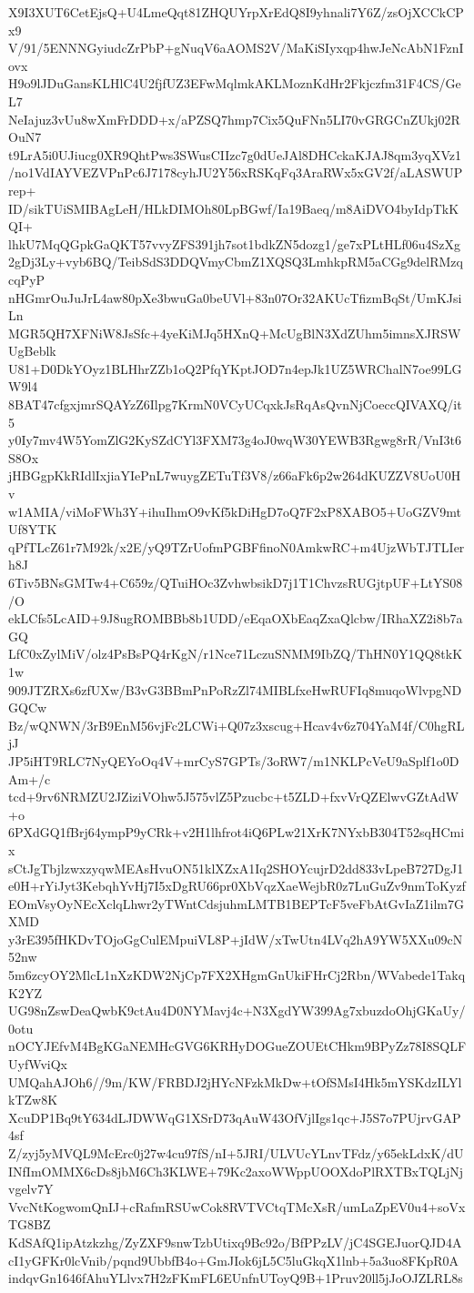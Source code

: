 X9I3XUT6CetEjsQ+U4LmeQqt81ZHQUYrpXrEdQ8I9yhnali7Y6Z/zsOjXCCkCPx9
V/91/5ENNNGyiudcZrPbP+gNuqV6aAOMS2V/MaKiSIyxqp4hwJeNcAbN1FznIovx
H9o9lJDuGansKLHlC4U2fjfUZ3EFwMqlmkAKLMoznKdHr2Fkjczfm31F4CS/GeL7
NeIajuz3vUu8wXmFrDDD+x/aPZSQ7hmp7Cix5QuFNn5LI70vGRGCnZUkj02ROuN7
t9LrA5i0UJiucg0XR9QhtPws3SWusCIIzc7g0dUeJAl8DHCckaKJAJ8qm3yqXVz1
/no1VdIAYVEZVPnPc6J7178cyhJU2Y56xRSKqFq3AraRWx5xGV2f/aLASWUPrep+
ID/sikTUiSMIBAgLeH/HLkDIMOh80LpBGwf/Ia19Baeq/m8AiDVO4byIdpTkKQI+
lhkU7MqQGpkGaQKT57vvyZFS391jh7sot1bdkZN5dozg1/ge7xPLtHLf06u4SzXg
2gDj3Ly+vyb6BQ/TeibSdS3DDQVmyCbmZ1XQSQ3LmhkpRM5aCGg9delRMzqcqPyP
nHGmrOuJuJrL4aw80pXe3bwuGa0beUVl+83n07Or32AKUcTfizmBqSt/UmKJsiLn
MGR5QH7XFNiW8JsSfc+4yeKiMJq5HXnQ+McUgBlN3XdZUhm5imnsXJRSWUgBeblk
U81+D0DkYOyz1BLHhrZZb1oQ2PfqYKptJOD7n4epJk1UZ5WRChalN7oe99LGW9l4
8BAT47cfgxjmrSQAYzZ6Ilpg7KrmN0VCyUCqxkJsRqAsQvnNjCoeccQIVAXQ/it5
y0Iy7mv4W5YomZlG2KySZdCYl3FXM73g4oJ0wqW30YEWB3Rgwg8rR/VnI3t6S8Ox
jHBGgpKkRIdlIxjiaYIePnL7wuygZETuTf3V8/z66aFk6p2w264dKUZZV8UoU0Hv
w1AMIA/viMoFWh3Y+ihuIhmO9vKf5kDiHgD7oQ7F2xP8XABO5+UoGZV9mtUf8YTK
qPfTLcZ61r7M92k/x2E/yQ9TZrUofmPGBFfinoN0AmkwRC+m4UjzWbTJTLIerh8J
6Tiv5BNsGMTw4+C659z/QTuiHOc3ZvhwbsikD7j1T1ChvzsRUGjtpUF+LtYS08/O
ekLCfs5LcAID+9J8ugROMBBb8b1UDD/eEqaOXbEaqZxaQlcbw/IRhaXZ2i8b7aGQ
LfC0xZylMiV/olz4PsBsPQ4rKgN/r1Nce71LczuSNMM9IbZQ/ThHN0Y1QQ8tkK1w
909JTZRXs6zfUXw/B3vG3BBmPnPoRzZl74MIBLfxeHwRUFIq8muqoWlvpgNDGQCw
Bz/wQNWN/3rB9EnM56vjFc2LCWi+Q07z3xscug+Hcav4v6z704YaM4f/C0hgRLjJ
JP5iHT9RLC7NyQEYoOq4V+mrCyS7GPTs/3oRW7/m1NKLPcVeU9aSplf1o0DAm+/c
tcd+9rv6NRMZU2JZiziVOhw5J575vlZ5Pzucbc+t5ZLD+fxvVrQZElwvGZtAdW+o
6PXdGQ1fBrj64ympP9yCRk+v2H1lhfrot4iQ6PLw21XrK7NYxbB304T52sqHCmix
sCtJgTbjlzwxzyqwMEAsHvuON51klXZxA1Iq2SHOYcujrD2dd833vLpeB727DgJ1
e0H+rYiJyt3KebqhYvHj7I5xDgRU66pr0XbVqzXaeWejbR0z7LuGuZv9nmToKyzf
EOmVsyOyNEcXclqLhwr2yTWntCdsjuhmLMTB1BEPTcF5veFbAtGvIaZ1ilm7GXMD
y3rE395fHKDvTOjoGgCulEMpuiVL8P+jIdW/xTwUtn4LVq2hA9YW5XXu09cN52nw
5m6zcyOY2MlcL1nXzKDW2NjCp7FX2XHgmGnUkiFHrCj2Rbn/WVabede1TakqK2YZ
UG98nZswDeaQwbK9ctAu4D0NYMavj4c+N3XgdYW399Ag7xbuzdoOhjGKaUy/0otu
nOCYJEfvM4BgKGaNEMHcGVG6KRHyDOGueZOUEtCHkm9BPyZz78I8SQLFUyfWviQx
UMQahAJOh6//9m/KW/FRBDJ2jHYcNFzkMkDw+tOfSMsI4Hk5mYSKdzILYlkTZw8K
XcuDP1Bq9tY634dLJDWWqG1XSrD73qAuW43OfVjlIgs1qc+J5S7o7PUjrvGAP4sf
Z/zyj5yMVQL9McErc0j27w4cu97fS/nI+5JRI/ULVUcYLnvTFdz/y65ekLdxK/dU
INfImOMMX6cDs8jbM6Ch3KLWE+79Kc2axoWWppUOOXdoPlRXTBxTQLjNjvgelv7Y
VvcNtKogwomQnIJ+cRafmRSUwCok8RVTVCtqTMcXsR/umLaZpEV0u4+soVxTG8BZ
KdSAfQ1ipAtzkzhg/ZyZXF9snwTzbUtixq9Bc92o/BfPPzLV/jC4SGEJuorQJD4A
cI1yGFKr0lcVnib/pqnd9UbbfB4o+GmJIok6jL5C5luGkqX1lnb+5a3uo8FKpR0A
indqvGn1646fAhuYLlvx7H2zFKmFL6EUnfnUToyQ9B+1Pruv20ll5jJoOJZLRL8s
